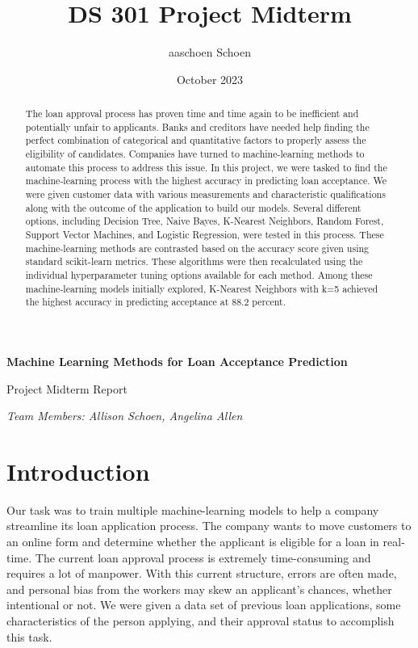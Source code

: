 \documentclass{article}
\title{DS 301 Project Midterm}
\author{aaschoen Schoen}
\date{October 2023}
\begin{document}
\begin{center}
{\Large \textbf{Machine Learning Methods for Loan Acceptance Prediction}

\vspace{10pt}

Project Midterm Report}

\vspace{10pt}

\textit{Team Members: Allison Schoen, Angelina Allen}
\end{center}




\begin{abstract}
The loan approval process has proven time and time again to be inefficient and potentially unfair to applicants. Banks and creditors have needed help finding the perfect combination of categorical and quantitative factors to properly assess the eligibility of candidates. Companies have turned to machine-learning methods to automate this process to address this issue. In this project, we were tasked to find the machine-learning process with the highest accuracy in predicting loan acceptance. We were given customer data with various measurements and characteristic qualifications along with the outcome of the application to build our models. Several different options, including Decision Tree, Naive Bayes, K-Nearest Neighbors, Random Forest, Support Vector Machines, and Logistic Regression, were tested in this process. These machine-learning methods are contrasted based on the accuracy score given using standard scikit-learn metrics. These algorithms were then recalculated using the individual hyperparameter tuning options available for each method. Among these machine-learning models initially explored, K-Nearest Neighbors with k=5 achieved the highest accuracy in predicting acceptance at 88.2 percent.
\end{abstract}

\section{Introduction}

Our task was to train multiple machine-learning models to help a company streamline its loan application process. The company wants to move customers to an online form and determine whether the applicant is eligible for a loan in real-time. The current loan approval process is extremely time-consuming and requires a lot of manpower. With this current structure, errors are often made, and personal bias from the workers may skew an applicant's chances, whether intentional or not. We were given a data set of previous loan applications, some characteristics of the person applying, and their approval status to accomplish this task. 
\end{document}
